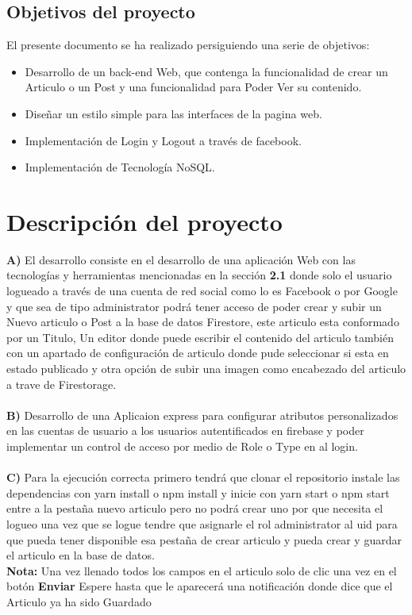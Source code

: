 \documentclass[60pt]{article}
\begin{document}
\subsection{Objetivos del proyecto}
El presente documento se ha realizado persiguiendo una serie de objetivos:
\begin{itemize}
    \item Desarrollo de un back-end Web, que contenga la funcionalidad de crear un Articulo o un Post y una funcionalidad para Poder Ver su contenido.
    \item Diseñar un estilo simple para las interfaces de la pagina web.
    \item Implementación de Login y Logout a través de facebook.
    \item Implementación de Tecnología NoSQL.
\end{itemize}

\section{Descripción del proyecto}
\textsf{\textbf{A)}} El desarrollo consiste en el desarrollo de una aplicación Web con las tecnologías y herramientas mencionadas en la sección \textsf{\textbf{2.1}} donde solo el usuario logueado a través de una cuenta de red social como lo es Facebook o por Google y que sea de tipo administrator podrá tener acceso de poder crear y subir un Nuevo articulo o Post a la base de datos Firestore, este articulo esta conformado por un Titulo, Un editor donde puede escribir el contenido del articulo también con un apartado de configuración de articulo donde pude seleccionar si esta en estado publicado y otra opción de subir una imagen como encabezado del articulo a trave de Firestorage.
\\
\\
\textsf{\textbf{B)}} Desarrollo de una Aplicaion express para configurar atributos personalizados en las cuentas de usuario a los usuarios autentificados en firebase y poder implementar un control de acceso por medio de Role o Type en al login.
\\
\\
\textsf{\textbf{C)}} Para la ejecución correcta primero tendrá que clonar el repositorio instale las dependencias con yarn install o npm install y inicie con yarn start o npm start entre a la pestaña nuevo articulo pero no podrá crear uno por que necesita el logueo una vez que se logue tendre que asignarle el rol administrator al uid para que pueda tener disponible esa pestaña de crear articulo y pueda crear y guardar el articulo en la base de datos.
\\
\textsf{\textbf{Nota:}} Una vez llenado todos los campos en el articulo solo de clic una vez en el botón \textsf{\textbf{Enviar}} Espere hasta que le aparecerá una notificación donde dice que el Articulo ya ha sido Guardado
\\
\end{document}
